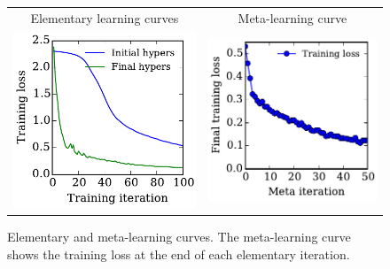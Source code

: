 \documentclass{article}
\newcommand{\primal}{elementary}
\newcommand{\Primal}{Elementary}
\begin{document}
\begin{figure}[t]
\begin{center}
\begin{tabular}{cc}
 \Primal{} learning curves & Meta-learning curve \\
\hspace{-1em}\includegraphics[width=0.5\columnwidth, height=0.5\columnwidth]{../experiments/Feb_3_training_schedules/3_adam_50/learning_curves_paper.pdf} &
\hspace{-1em}\includegraphics[width=0.5\columnwidth, height=0.5\columnwidth]{../experiments/Feb_3_training_schedules/3_adam_50/meta_learning_curve_paper.pdf}
\end{tabular}
\vskip -0.1in
\caption{\Primal{} and meta-learning curves.
The meta-learning curve shows the training loss at the end of each \primal{} iteration.}
\label{fig:learning curves}
\end{center}
\vskip -0.2in
\end{figure}
\end{document}
